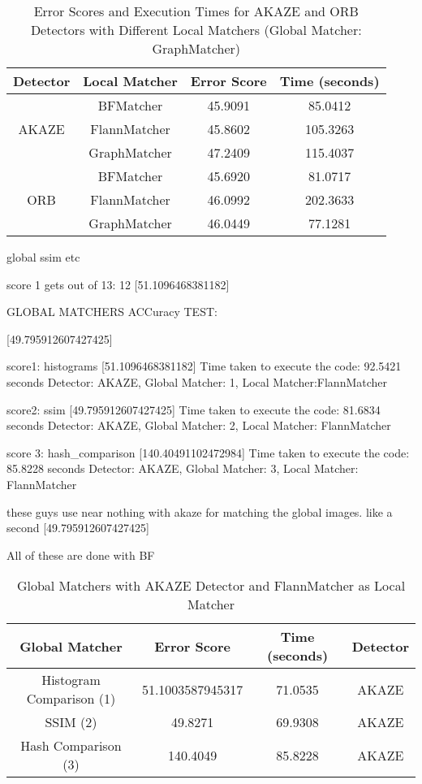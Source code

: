 \begin{table}[H]
    \centering
    \begin{tabular}{|c|c|c|c|}
    \hline
    \textbf{Detector} & \textbf{Local Matcher} & \textbf{Error Score} & \textbf{Time (seconds)} \\ \hline
    \multirow{3}{*}{AKAZE} & BFMatcher & 45.9091 & 85.0412 \\ \cline{2-4}
                           & FlannMatcher & 45.8602 & 105.3263 \\ \cline{2-4}
                           & GraphMatcher & 47.2409 & 115.4037 \\ \hline
    \multirow{3}{*}{ORB}   & BFMatcher & 45.6920 & 81.0717 \\ \cline{2-4}
                           & FlannMatcher & 46.0992 & 202.3633 \\ \cline{2-4}
                           & GraphMatcher & 46.0449 & 77.1281 \\ \hline
    \end{tabular}
    \caption{Error Scores and Execution Times for AKAZE and ORB Detectors with Different Local Matchers (Global Matcher: GraphMatcher)}
    \end{table}
    


global ssim etc

score 1 gets out of 13: 12  [51.1096468381182]

GLOBAL MATCHERS ACCuracy TEST:

[49.795912607427425]

score1: histograms
[51.1096468381182]
Time taken to execute the code: 92.5421 seconds
Detector: AKAZE, Global Matcher: 1, Local Matcher:FlannMatcher


score2: ssim
[49.795912607427425]
Time taken to execute the code: 81.6834 seconds
Detector: AKAZE, Global Matcher: 2, Local Matcher: FlannMatcher

score 3: hash\_comparison
[140.40491102472984]
Time taken to execute the code: 85.8228 seconds
Detector: AKAZE, Global Matcher: 3, Local Matcher: FlannMatcher

these guys use near nothing with akaze for matching the global images. like a second 
[49.795912607427425]

All of these are done with BF
\begin{table}[H]
    \centering
    \begin{tabular}{|c|c|c|c|}
    \hline
    \textbf{Global Matcher} & \textbf{Error Score} & \textbf{Time (seconds)} & \textbf{Detector} \\ \hline
    Histogram Comparison (1) & 51.1003587945317 &  71.0535 & AKAZE \\ \hline
    SSIM (2)                 & 49.8271 & 69.9308 & AKAZE \\ \hline
    Hash Comparison (3)      & 140.4049 & 85.8228 & AKAZE \\ \hline
    \end{tabular}
    \caption{Global Matchers with AKAZE Detector and FlannMatcher as Local Matcher}
    \end{table}


